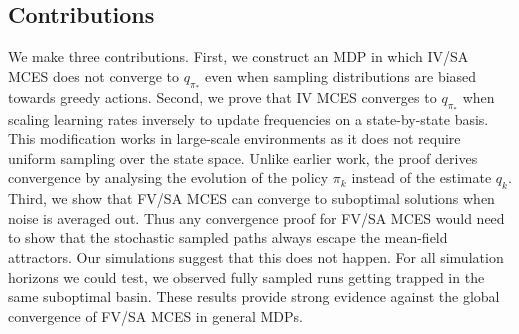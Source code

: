 \documentclass{article}
\begin{document}

\subsection{Contributions}


We make three contributions.
First, we construct an MDP in which IV/SA MCES does not converge to $q_{\pi_*}$ even when sampling distributions are biased towards greedy actions.
% 
Second, we prove that IV MCES converges to $q_{\pi_*}$ when scaling learning rates inversely to update frequencies on a state-by-state basis.
This modification works in large-scale environments as it does not require uniform sampling over the state space.
Unlike earlier work, the proof derives convergence by analysing the evolution of the policy $\pi_k$ instead of the estimate $q_k$.
% 
Third, we show that FV/SA MCES can converge to suboptimal solutions when noise is averaged out.
Thus any convergence proof for FV/SA MCES would need to show that the stochastic sampled paths always escape the mean-field attractors.
Our simulations suggest that this does not happen.
For all simulation horizons we could test, we observed fully sampled runs getting trapped in the same suboptimal basin.
These results provide strong evidence against the global convergence of
FV/SA MCES in general MDPs.


\end{document}
